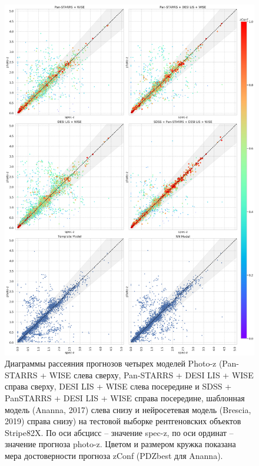 \documentclass[fleqn,usenatbib]{mnras}
\begin{document}
\begin{figure}
    \centering
    \includegraphics[width=0.9\linewidth]{images/scatterplots-stripe82x.png}
    \caption{Диаграммы рассеяния прогнозов четырех моделей Photo-z (Pan-STARRS + WISE слева сверху, Pan-STARRS + DESI LIS + WISE справа сверху, DESI LIS + WISE слева посередине и SDSS + PanSTARRS + DESI LIS + WISE справа посередине, шаблонная модель (Ananna, 2017) слева снизу и нейросетевая модель (Brescia, 2019) справа снизу) на тестовой выборке рентгеновских объектов Stripe82X. По оси абсцисс -- значение spec-z, по оси ординат -- значение прогноза photo-z. Цветом и размером кружка показана мера достоверности прогноза zConf (PDZbest для Ananna).}
    \label{fig:s82x}
\end{figure}
\end{document}
